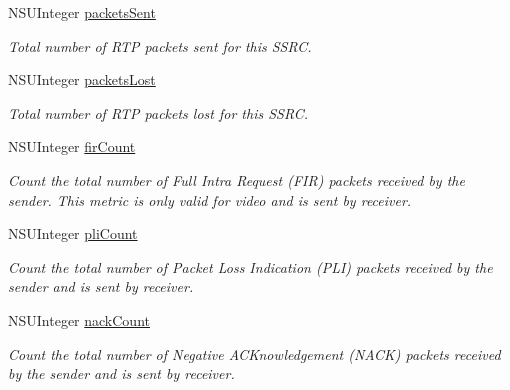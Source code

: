 \begin{DoxyCompactItemize}
N\+S\+U\+Integer \hyperlink{interface_c_c_video_sender_status_abd80886bdd428f289e94db3bb2031689}{packets\+Sent}
\begin{DoxyCompactList}\small\item\em Total number of R\+TP packets sent for this S\+S\+RC. \end{DoxyCompactList}\item 
\mbox{\label{interface_c_c_video_sender_status_a72c7a8808b9c1a4d82d84b645a555432}} 
N\+S\+U\+Integer \hyperlink{interface_c_c_video_sender_status_a72c7a8808b9c1a4d82d84b645a555432}{packets\+Lost}
\begin{DoxyCompactList}\small\item\em Total number of R\+TP packets lost for this S\+S\+RC. \end{DoxyCompactList}\item 
\mbox{\label{interface_c_c_video_sender_status_a2f0cc1039474c2d91974ca34283e4b2e}} 
N\+S\+U\+Integer \hyperlink{interface_c_c_video_sender_status_a2f0cc1039474c2d91974ca34283e4b2e}{fir\+Count}
\begin{DoxyCompactList}\small\item\em Count the total number of Full Intra Request (F\+IR) packets received by the sender. This metric is only valid for video and is sent by receiver. \end{DoxyCompactList}\item 
\mbox{\label{interface_c_c_video_sender_status_abceead3237f848189b93b43cf19fb16d}} 
N\+S\+U\+Integer \hyperlink{interface_c_c_video_sender_status_abceead3237f848189b93b43cf19fb16d}{pli\+Count}
\begin{DoxyCompactList}\small\item\em Count the total number of Packet Loss Indication (P\+LI) packets received by the sender and is sent by receiver. \end{DoxyCompactList}\item 
\mbox{\label{interface_c_c_video_sender_status_ad1091dff8dd29b0a975da0d567f67875}} 
N\+S\+U\+Integer \hyperlink{interface_c_c_video_sender_status_ad1091dff8dd29b0a975da0d567f67875}{nack\+Count}
\begin{DoxyCompactList}\small\item\em Count the total number of Negative A\+C\+Knowledgement (N\+A\+CK) packets received by the sender and is sent by receiver. \end{DoxyCompactList}\item 

\end{DoxyCompactItemize}
